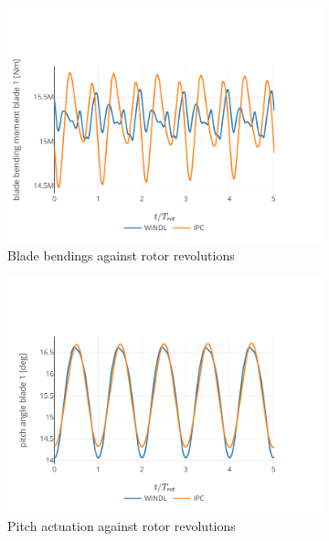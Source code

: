 \begin{figure}
  \centering
  \begin{subfigure}[b]{0.48\textwidth}
      \centering
      \includegraphics[width=\textwidth]{images/steady_rollout_blade_bending.pdf}
      \caption{Blade bendings against rotor revolutions}
      \label{fig:steady-rollout-blade-bending}
  \end{subfigure}
  \begin{subfigure}[b]{0.48\textwidth}
      \centering
      \includegraphics[width=\textwidth]{images/steady_rollout_pitch.pdf}
      \caption{Pitch actuation against rotor revolutions}
      \label{fig:steady-rollout-pitch}
  \end{subfigure}
  \begin{subfigure}[b]{0.48\textwidth}

\end{subfigure}
\end{figure}
